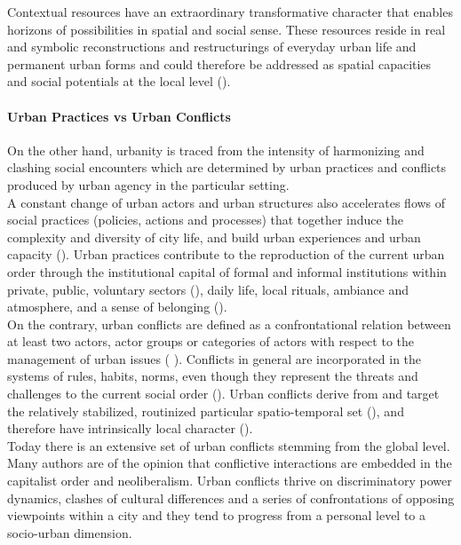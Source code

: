 \documentclass[11pt]{report}
\begin{document}
{{{Contextual resources have an extraordinary transformative character that enables horizons of possibilities in spatial and social sense.
These resources reside in real and symbolic reconstructions and restructurings of everyday urban life and permanent urban forms and could therefore be addressed as spatial capacities and social potentials at the local level (\href{Swyngedouw}{\citealt{swyngedouw_glocal_2003}}).

\paragraph{Urban Practices vs Urban Conflicts}

On the other hand, urbanity is traced from the intensity of harmonizing and clashing social encounters which are determined by urban practices and conflicts produced by urban agency in the particular setting. 
\\

A constant change of urban actors and urban structures also accelerates flows of social practices (policies, actions and processes) that together induce the complexity and diversity of city life, and build urban experiences and urban capacity (\href{Robinson}{\citealt{robinson_ordinary_2006}}).
Urban practices contribute to the reproduction of the current urban order through the institutional capital of formal and informal institutions within private, public, voluntary sectors (\href{Vujosevic}{\citealt{vujosevic_regionalizam_2015}}), daily life, local rituals, ambiance and atmosphere, and a sense of belonging (\href{ref}{\citealt{volic_belgrade_2012}}).
\\

On the contrary, urban conflicts are defined as a confrontational relation between at least two actors, actor groups or categories of actors with respect to the management of urban issues (\href{ref}{\citealt{Aznar et al. 2006}} {\href{ref}{\citealt{Renau and Lozano 2016}}).
Conflicts in general are incorporated in the systems of rules, habits, norms, even though they represent the threats and challenges to the current social order (\cite{Sears and Cairn 2005}).
Urban conflicts derive from and target the relatively stabilized, routinized particular spatio-temporal set (\citealt{Brenner and Theodore 2005}), and therefore have intrinsically local character (\href{Sassen}{\citealt{sassen_toward_2007}}).
\\

Today there is an extensive set of urban conflicts stemming from the global level.
Many authors are of the opinion that conflictive interactions are embedded in the capitalist order and neoliberalism.
Urban conflicts thrive on discriminatory power dynamics, clashes of cultural differences and a series of confrontations of opposing viewpoints within a city and they tend to progress from a personal level to a socio-urban dimension.
\\

}}}}
\end{document}
